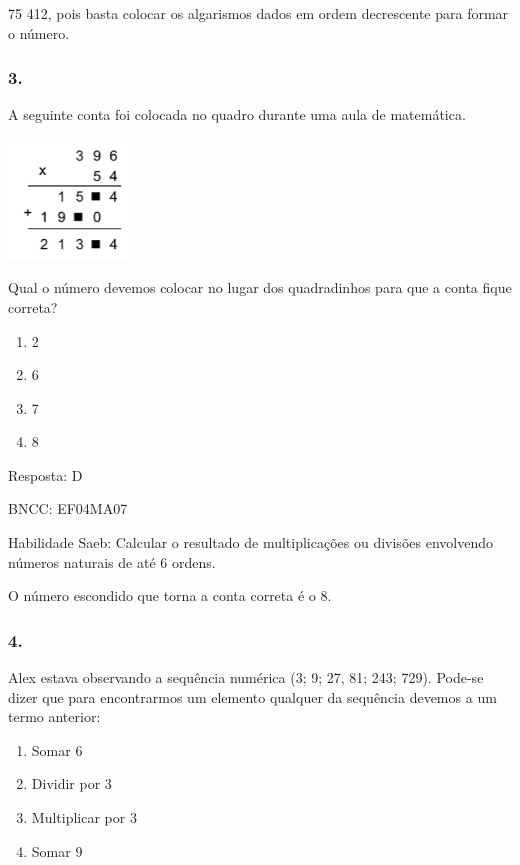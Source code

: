 75 412, pois basta colocar os algarismos dados em ordem decrescente para
formar o número.

\subsubsection{3.}\label{section-174}

A seguinte conta foi colocada no quadro durante uma aula de matemática.

\includegraphics[width=1.26282in,height=1.25762in]{media/image159.png}

Qual o número devemos colocar no lugar dos quadradinhos para que a conta
fique correta?

\begin{enumerate}
\def\labelenumi{\alph{enumi})}
\item
  2
\item
  6
\item
  7
\item
  8
\end{enumerate}

Resposta: D

BNCC: EF04MA07

Habilidade Saeb: Calcular o resultado de multiplicações ou divisões
envolvendo números naturais de até 6 ordens.

O número escondido que torna a conta correta é o 8.

\subsubsection{4.}\label{section-175}

Alex estava observando a sequência numérica (3; 9; 27, 81; 243; 729).
Pode-se dizer que para encontrarmos um elemento qualquer da sequência
devemos a um termo anterior:

\begin{enumerate}
\def\labelenumi{\alph{enumi})}
\item
  Somar 6
\item
  Dividir por 3
\item
  Multiplicar por 3
\item
  Somar 9
\end{enumerate}


